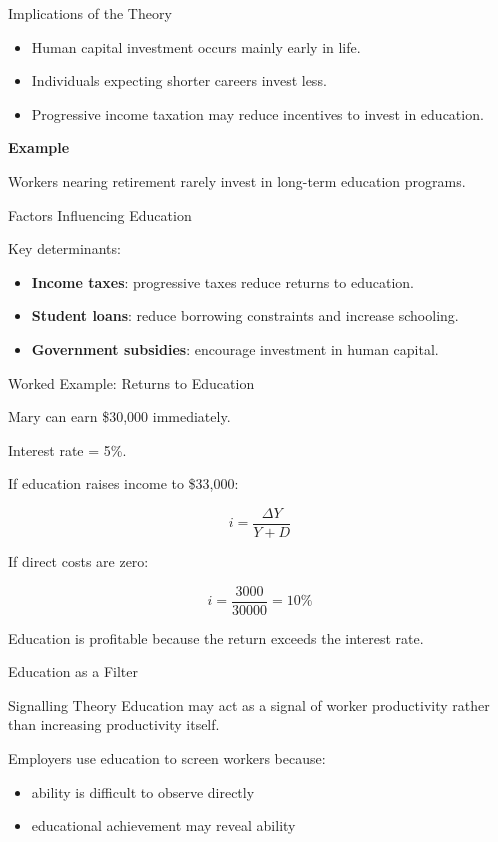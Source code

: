 \documentclass[aspectratio=169]{beamer}
\begin{document}
\begin{frame}{Implications of the Theory}

\begin{itemize}
\item Human capital investment occurs mainly early in life.
\item Individuals expecting shorter careers invest less.
\item Progressive income taxation may reduce incentives to invest in education.
\end{itemize}

\textbf{Example}

Workers nearing retirement rarely invest in long-term education programs.
\end{frame}

\begin{frame}{Factors Influencing Education}

Key determinants:

\begin{itemize}
\item \textbf{Income taxes}: progressive taxes reduce returns to education.
\item \textbf{Student loans}: reduce borrowing constraints and increase schooling.
\item \textbf{Government subsidies}: encourage investment in human capital.
\end{itemize}
\end{frame}

\begin{frame}{Worked Example: Returns to Education}

Mary can earn \$30,000 immediately.

Interest rate = 5\%.

If education raises income to \$33,000:

\[
i = \frac{\Delta Y}{Y+D}
\]

If direct costs are zero:

\[
i = \frac{3000}{30000} = 10\%
\]

Education is profitable because the return exceeds the interest rate.
\end{frame}

\begin{frame}{Education as a Filter}

\begin{block}{Signalling Theory}
Education may act as a signal of worker productivity rather than increasing productivity itself.
\end{block}

Employers use education to screen workers because:

\begin{itemize}
\item ability is difficult to observe directly
\item educational achievement may reveal ability
\end{itemize}
\end{frame}
\end{document}
